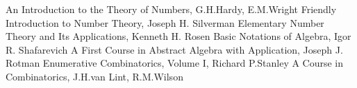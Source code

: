 
\begin{thebibliography}{9}
	 An Introduction to the Theory of Numbers, G.H.Hardy, E.M.Wright
	 Friendly Introduction to Number Theory, Joseph H. Silverman
	 Elementary Number Theory and Its Applications, Kenneth H. Rosen
	 Basic Notations of Algebra, Igor R. Shafarevich
	 A First Course in Abstract Algebra with Application, Joseph J. Rotman
	 Enumerative Combinatorics, Volume I, Richard P.Stanley
	 A Course in Combinatorics, J.H.van Lint, R.M.Wilson
\end{thebibliography}
